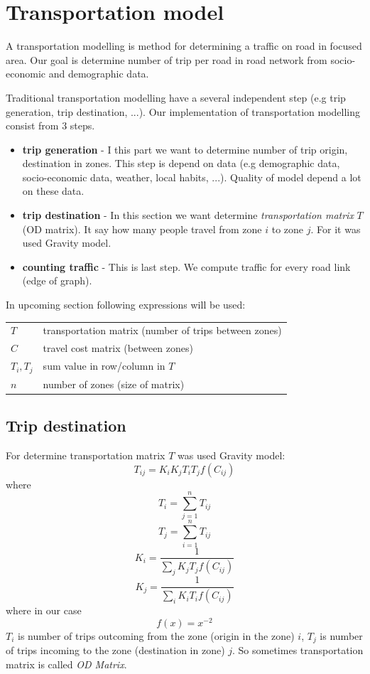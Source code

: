 \section{Transportation model}
A transportation modelling is method for determining a traffic on road in focused area. Our goal is determine number of trip per road in road network from socio-economic and demographic data.

Traditional transportation modelling have a several independent step (e.g trip generation, trip destination, ...). Our implementation of transportation modelling consist from 3 steps.
\begin{itemize}
\item[ ] \textbf{trip generation} - I this part we want to determine number of trip origin, destination in zones. This step is depend on data (e.g demographic data, socio-economic data, weather, local habits, ...). Quality of model depend a lot on these data.
\item[ ] \textbf{trip destination} - In this section we want determine \textit{transportation matrix} $T$ (OD matrix). It say how many people travel from zone $i$ to zone $j$. For it was used Gravity model.
\item[ ] \textbf{counting traffic} - This is last step.  We compute traffic for every road link (edge of graph).
\end{itemize}
In upcoming section following expressions will be used:

\begin{tabular}{ll}
$T$ & transportation matrix (number of trips between zones)\\
$C$ & travel cost matrix (between zones) \\
$T_i, T_j$ & sum value in row/column in $T$\\
$n$ & number of zones (size of matrix)
\end{tabular}

\subsection{Trip destination}

For determine transportation matrix $T$ was used Gravity model:
$$T_{ij} = K_i K_j T_i T_j f(C_{ij})$$
where
$$T_i = \sum_{j = 1}^{n} T_{ij}$$
$$T_j = \sum_{i = 1}^{n} T_{ij}$$
$$K_i = \frac{1}{\sum_{j} K_j T_j f(C_{ij})}$$
$$K_j = \frac{1}{\sum_{i} K_i T_i f(C_{ij})}$$
where in our case $$f(x) = x^{-2}$$
$T_i$ is number of trips outcoming from the zone (origin in the zone) $i$, $T_j$ is number of trips incoming to the zone (destination in zone) $j$. So sometimes transportation matrix is called \textit{OD Matrix}. 

